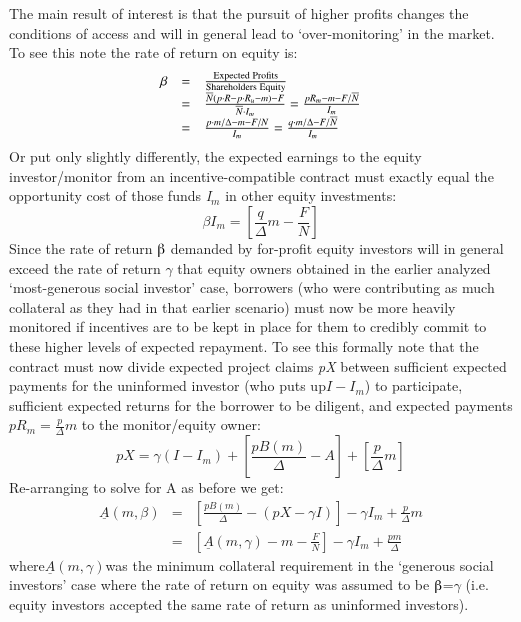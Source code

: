 \documentclass{article} %
\begin{document}
\noindent The main result of interest is that the pursuit of higher profits changes the conditions of access and will in general lead to `over-monitoring' in the market.  To see this note the rate of return on equity is: 
\begin{equation} \label{1.15)} 
\begin{array}{rcl} {\beta } & {=} & {\frac{{\rm Expected\; Profits}}{{\rm Shareholders\; Equity}} } \\ {} & {=} & {\frac{\overline{N}(p\cdot R-p\cdot R_{u} -m)-F}{\overline{N}\cdot I_{m} } =\frac{pR_{m} -m-F/\overline{N}}{I_{m} } } \\ {} & {=} & {\frac{p\cdot m/\Delta -m-F/N}{I_{m} } =\frac{q\cdot m/\Delta -F/\overline{N}}{I_{m} } } \end{array} 
\end{equation} 
Or put only slightly differently, the expected earnings to the equity investor/monitor from an incentive-compatible contract must exactly equal the opportunity cost of those funds \textit{I${}_{m}$} in other equity investments:   
\[\beta I_{m} =\left[\frac{q}{\Delta } m-\frac{F}{N} \right]\] 
Since the rate of return $\betaup$ demanded by for-profit equity investors will in general exceed the rate of return $\gamma$ that equity owners obtained in the earlier analyzed `most-generous social investor' case, borrowers (who were contributing as much collateral as they had in that earlier scenario) must now be more heavily monitored if incentives are to be kept in place for them to credibly commit to these higher levels of expected repayment. To see this formally note that the contract must now divide expected project claims \textit{pX }between sufficient expected payments for the uninformed investor (who puts up$I-I_{m} $) to participate, sufficient expected returns for the borrower to be diligent, and expected payments $pR_{m} =\frac{p}{\Delta } m$ to the monitor/equity owner:
\begin{equation} \label{1.15)} 
pX=\gamma (I-I_{m} )+\left[\frac{pB(m)}{\Delta } -A\right]+\left[\frac{p}{\Delta } m\right] 
\end{equation} 
Re-arranging to solve for A as before we get:
\[\begin{array}{rcl} {\underline{A}(m,\beta )} & {=} & {\left[\frac{pB(m)}{\Delta } -(pX-\gamma I)\right]-\gamma I_{m} +\frac{p}{\Delta } m} \\ {} & {=} & {\left[\underline{A}(m,\gamma )-m-\frac{F}{N} \right]-\gamma I_{m} +\frac{pm}{\Delta } } \end{array}\] 
where$\underline{A}(m,\gamma )$was the minimum collateral requirement in the `generous social investors' case where the rate of return on equity was assumed to be $\betaup$=$\gamma$ (i.e. equity investors accepted the same rate of return as uninformed investors).
\end{document}
